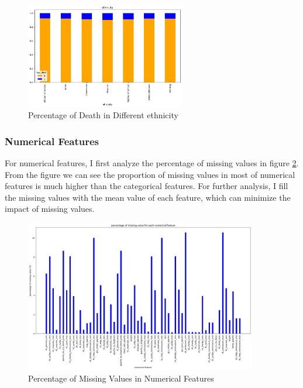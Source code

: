 \documentclass[a4paper, oneside, final, 12pt]{scrartcl} %
\begin{document}
\begin{figure}[ht]
  \centering
  \includegraphics[width=0.62\textwidth]{"./image/dataset/ethnicity_dis.png"}
  \caption{Percentage of Death in Different ethnicity}
  \label{fig:ethnicity}
\end{figure}

\clearpage

\subsubsection{Numerical Features}

For numerical features, I first analyze the percentage of 
missing values in figure \ref{fig:num_nan_percentage}.
From the figure we can see the proportion of missing values in most of numerical features
is much higher than the categorical features.
For further analysis, I fill the missing values with the mean value of each feature,
which can minimize the impact of missing values.

\begin{figure}[h]
  \centering
  \includegraphics[width=0.9\textwidth]{"./image/dataset/num_nan_percentage.png"}
  \caption{Percentage of Missing Values in Numerical Features}
  \label{fig:num_nan_percentage}
\end{figure}
\end{document}
